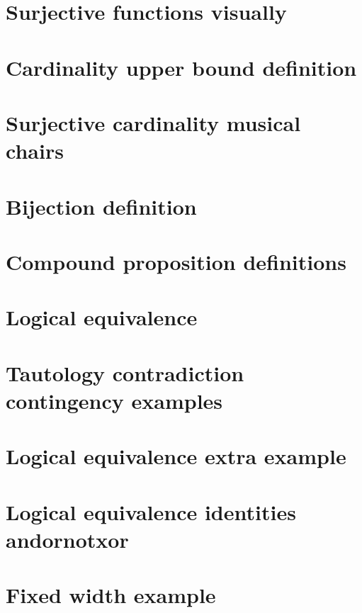 \section*{Surjective functions visually}

\vfill
\section*{Cardinality upper bound definition}

\vfill
\section*{Surjective cardinality musical chairs}

\vfill
\section*{Bijection definition}

\vfill
\section*{Compound proposition definitions}

\vfill
\section*{Logical equivalence}

\vfill
\section*{Tautology contradiction contingency examples}

\vfill
\section*{Logical equivalence extra example}

\vfill
\section*{Logical equivalence identities andornotxor}

\vfill
\section*{Fixed width example}

\vfill

